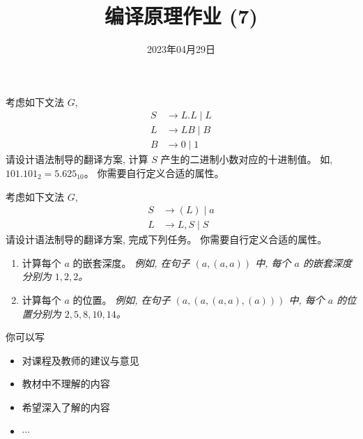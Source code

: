 \documentclass[a4paper, justified]{tufte-handout}
\title{编译原理作业 (7)}
\date{2023年04月29日}
\begin{document}
\maketitle
\noplagiarism %
\begin{abstract}
\end{abstract}
\beginrequired

\begin{problem}
  考虑如下文法 $G$,
  \begin{align*}
    S &\to L.L \mid L \\
    L &\to LB \mid B \\
    B &\to 0 \mid 1
  \end{align*}
  请设计语法制导的翻译方案, 计算 $S$ 产生的二进制小数对应的十进制值。
  如, $101.101_{2} = 5.625_{10}$。
  你需要自行定义合适的属性。
\end{problem}

\begin{solution}
\end{solution}


\begin{problem}
  考虑如下文法 $G$,
  \begin{align*}
    S &\to (L) \mid a \\
    L &\to L, S \mid S
  \end{align*}
  请设计语法制导的翻译方案, 完成下列任务。
  你需要自行定义合适的属性。
  \begin{enumerate}[(1)]
    \item 计算每个 $a$ 的嵌套深度。
      {\it 例如, 在句子 $(a, (a, a))$ 中, 每个 $a$ 的嵌套深度分别为 $1, 2, 2$。}
    \item 计算每个 $a$ 的位置。
      {\it 例如, 在句子 $(a, (a, (a, a), (a)))$ 中, 每个 $a$ 的位置分别为
        $2, 5, 8, 10, 14$。}
  \end{enumerate}
\end{problem}

\begin{solution}
\end{solution}



\beginfb

你可以写
\begin{itemize}
  \item 对课程及教师的建议与意见
  \item 教材中不理解的内容
  \item 希望深入了解的内容
  \item $\cdots$
\end{itemize}
\end{document}
